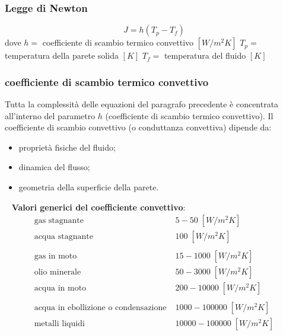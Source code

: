 \subsubsection{Legge di Newton}
\[
    J = h (T_p - T_f)
\]
dove \newline
$h =$ coefficiente di scambio termico convettivo $[W/m^2 K]$\newline
$T_p =$ temperatura della parete solida $[K]$\newline
$T_f =$ temperatura del fluido $[K]$
\subsubsection{coefficiente di scambio termico convettivo}
Tutta la complessità delle equazioni del paragrafo precedente è concentrata all'interno del parametro $h$ (coefficiente di scambio termico convettivo).\newline
Il coefficiente di scambio convettivo (o conduttanza convettiva) dipende da:
\begin{itemize}
    \item proprietà fisiche del fluido;
    \item dinamica del flusso;
    \item geometria della superficie della parete.
\end{itemize}
\ \newline
\textbf{Valori generici del coefficiente convettivo}:\newline
\[
    \begin{matrix}
        \text{gas stagnante}\; & 5-50 \; [W/m^2K]\\
        \text{acqua stagnante}\;& 100 \; [W/m^2K]\\
        \\
        \text{gas in moto}\; & 15-1000 \; [W/m^2K]\\
        \text{olio minerale}\; & 50-3000\; [W/m^2K]\\
        \text{acqua in moto}\; &200-10000\; [W/m^2K]\\
        \\
        \text{acqua in ebollizione o condensazione}\; &1000-100000\; [W/m^2K]\\
        \text{metalli liquidi}\; &10000-100000\; [W/m^2K]\\
    \end{matrix}
\]

